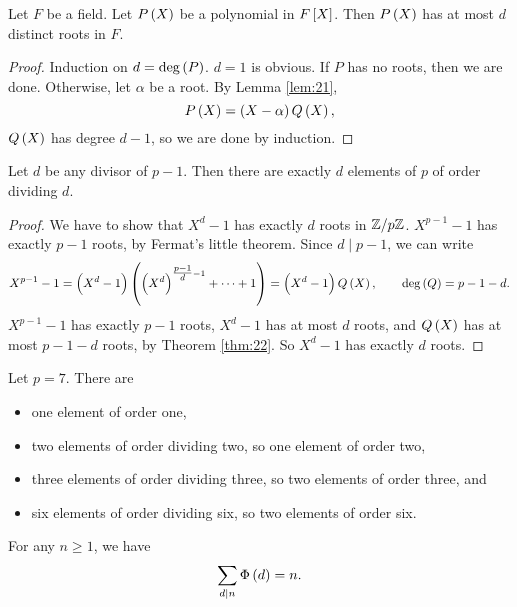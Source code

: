 \begin{theorem}
\label{thm:22}
Let $ F $ be a field. Let $ P\br{X} $ be a polynomial in $ F\sbr{X} $. Then $ P\br{X} $ has at most $ d $ distinct roots in $ F $.
\end{theorem}

\begin{proof}
Induction on $ d = \deg\br{P} $. $ d = 1 $ is obvious. If $ P $ has no roots, then we are done. Otherwise, let $ \alpha $ be a root. By Lemma \ref{lem:21},
$$ P\br{X} = \br{X - \alpha}Q\br{X}, $$
$ Q\br{X} $ has degree $ d - 1 $, so we are done by induction.
\end{proof}

\pagebreak

\begin{corollary}
\label{cor:23}
Let $ d $ be any divisor of $ p - 1 $. Then there are exactly $ d $ elements of $ \unit{p} $ of order dividing $ d $.
\end{corollary}

\begin{proof}
We have to show that $ X^d - 1 $ has exactly $ d $ roots in $ \mathbb{Z} / p\mathbb{Z} $. $ X^{p - 1} - 1 $ has exactly $ p - 1 $ roots, by Fermat's little theorem. Since $ d \mid p - 1 $, we can write
$$ X^{p - 1} - 1 = \br{X^d - 1}\br{\br{X^d}^{\tfrac{p - 1}{d} - 1} + \dots + 1} = \br{X^d - 1}Q\br{X}, \qquad \deg\br{Q} = p - 1 - d. $$
$ X^{p - 1} - 1 $ has exactly $ p - 1 $ roots, $ X^d - 1 $ has at most $ d $ roots, and $ Q\br{X} $ has at most $ p - 1 - d $ roots, by Theorem \ref{thm:22}. So $ X^d - 1 $ has exactly $ d $ roots.
\end{proof}

\begin{example*}
Let $ p = 7 $. There are
\begin{itemize}
\item one element of order one,
\item two elements of order dividing two, so one element of order two,
\item three elements of order dividing three, so two elements of order three, and
\item six elements of order dividing six, so two elements of order six.
\end{itemize}
\end{example*}

\begin{lemma}
\label{lem:24}
For any $ n \ge 1 $, we have
$$ \sum_{d \mid n} \Phi\br{d} = n. $$
\end{lemma}

